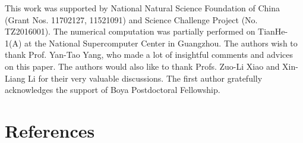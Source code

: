 \documentclass[review]{elsarticle}
\begin{document}
This work was supported by National Natural Science Foundation of China (Grant Nos. 11702127, 11521091) and Science Challenge Project (No. TZ2016001). The numerical computation was partially performed on TianHe-1(A) at the National Supercomputer Center in Guangzhou. The authors wish to thank Prof. Yan-Tao Yang, who made a lot of insightful comments and advices on this paper. The authors would also like to thank Profs. Zuo-Li Xiao and Xin-Liang Li for their very valuable discussions. The first author gratefully acknowledges the support of Boya Postdoctoral Fellowship.



\section*{References}



\end{document}
